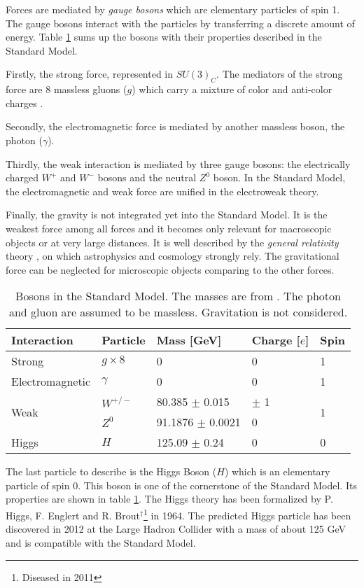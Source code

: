 Forces are mediated by \textit{gauge bosons} which are elementary particles of spin 1. The gauge bosons interact with the particles by transferring a discrete amount of energy. Table \ref{table:Bosons} sums up the bosons with their properties described in the Standard Model.

Firstly, the strong force, represented in $SU(3)_{C}$. The mediators of the strong force are 8 massless gluons ($g$) which carry a mixture of color and anti-color charges \cite{Griffiths:343277}.

Secondly, the electromagnetic force is mediated by another massless boson, the photon ($\gamma$).

Thirdly, the weak interaction is mediated by three gauge bosons: the electrically charged $W^+$ and $W^-$ bosons and the neutral $Z^0$ boson. In the Standard Model, the electromagnetic and weak force are unified in the electroweak theory.

Finally, the gravity is not integrated yet into the Standard Model. It is the weakest force among all forces and it becomes only relevant for macroscopic objects or at very large distances. It is well described by the \textit{general relativity} theory \cite{Einstein:1905ve}, on which astrophysics and cosmology strongly rely. The gravitational force can be neglected for microscopic objects comparing to the other forces.

\begin{table}[htb!]
  \centering
  \caption{Bosons in the Standard Model. The masses are from \cite{Patrignani:2016xqp}. The photon and gluon are assumed to be massless. Gravitation is not considered.}
  \label{table:Bosons}
  \begin{tabular}{@{}lllll@{}} \toprule
    Interaction & Particle & Mass [GeV] & Charge [$e$] & Spin\\
    \midrule
    Strong & $g \times 8$ & 0 & 0 & 1\\
    Electromagnetic & $\gamma$ & 0 & 0 & 1\\
    \multirow{2}{*}{Weak} & $W^{+/-}$ & 80.385 $\pm$ 0.015 & $\pm$ 1 & \multirow{2}{*}{1}\\
    & $Z^0$ & 91.1876 $\pm$ 0.0021 & 0 &\\
    Higgs & $H$ & 125.09 $\pm$ 0.24 & 0 & 0\\
    \bottomrule
  \end{tabular}
\end{table}

The last particle to describe is the Higgs Boson ($H$) which is an elementary particle of spin 0. This boson is one of the cornerstone of the Standard Model. Its properties are shown in table \ref{table:Bosons}. The Higgs theory \cite{Higgs:1964pj, Englert:1964et} has been formalized by P. Higgs, F. Englert and R. Brout$^\dagger$\footnote{Diseased in 2011} in 1964. The predicted Higgs particle has been discovered in 2012 at the Large Hadron Collider \cite{Aad:2012tfa, Chatrchyan:2012xdj} with a mass of about 125 GeV and is compatible with the Standard Model.

